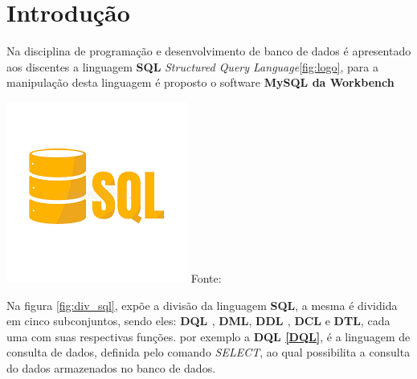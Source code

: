 
\section{Introdução}




\noindent \begin{minipage}[c]{0.6\textwidth}
  \vspace {1cm}
\par Na disciplina de programação e desenvolvimento de banco de dados é apresentado aos discentes a linguagem \textbf{SQL} \textit{Structured Query Language}\ref{fig:logo}, para a manipulação desta linguagem é proposto o software \textbf{MySQL da Workbench}

\end{minipage}
\begin{minipage}[c]{0.4\textwidth}
  \includegraphics[width=\textwidth]{figure/logo_sql.png}
  	\label{fig:logo}
    {\fontsize{10pt}{\baselineskip}\selectfont
    Fonte: 
  }

\end{minipage}

\par Na figura \ref{fig:div_sql}, expõe a divisão da linguagem \textbf{SQL}, a mesma é dividida em cinco subconjuntos, sendo eles: \textbf{DQL \label{DQL}}, \textbf{DML}, \textbf{DDL \label{DDL}}, \textbf{DCL} e \textbf{DTL}, cada uma com suas respectivas funções. por exemplo a \textbf{DQL \ref{DQL}}, é a linguagem de consulta de dados, definida pelo comando \textit{SELECT}, ao qual possibilita a consulta do dados armazenados no banco de dados.

